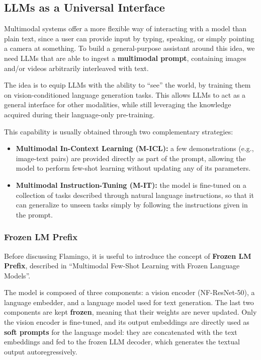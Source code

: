 \subsection{LLMs as a Universal Interface}
Multimodal systems offer a more flexible way of interacting with a model than plain text, since a user can provide input by typing, speaking, or simply pointing a camera at something.
To build a general-purpose assistant around this idea, we need LLMs that are able to ingest a \textbf{multimodal prompt}, containing images and/or videos arbitrarily interleaved with text.

The idea is to equip LLMs with the ability to ``see'' the world, by training them on vision-conditioned language generation tasks.
This allows LLMs to act as a general interface for other modalities, while still leveraging the knowledge acquired during their language-only pre-training.

This capability is usually obtained through two complementary strategies:
\begin{itemize}
    \item \textbf{Multimodal In-Context Learning (M-ICL):} a few demonstrations (e.g., image-text pairs) are provided directly as part of the prompt, allowing the model to perform few-shot learning without updating any of its parameters.
    \item \textbf{Multimodal Instruction-Tuning (M-IT):} the model is fine-tuned on a collection of tasks described through natural language instructions, so that it can generalize to unseen tasks simply by following the instructions given in the prompt.
\end{itemize}

\subsubsection{Frozen LM Prefix}
Before discussing Flamingo, it is useful to introduce the concept of \textbf{Frozen LM Prefix}, described in ``Multimodal Few-Shot Learning with Frozen Language Models''.

The model is composed of three components: a vision encoder (NF-ResNet-50), a language embedder, and a language model used for text generation. The last two components are kept \textbf{frozen}, meaning that their weights are never updated. Only the vision encoder is fine-tuned, and its output embeddings are directly used as \textbf{soft prompts} for the language model:
they are concatenated with the text embeddings and fed to the frozen LLM decoder, which generates the textual output autoregressively.

